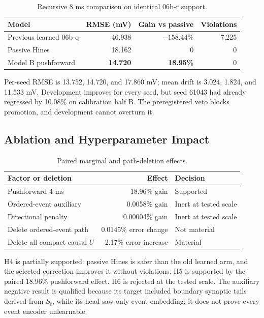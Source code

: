 \documentclass[11pt]{article}
\begin{document}
\begin{table}[t]
\centering
\caption{Recursive 8 ms comparison on identical 06b-r support.}
\label{tab:recursive}
\small
\begin{tabular}{lrrr}
\toprule
Model & RMSE (mV) & Gain vs passive & Violations \\
\midrule
Previous learned 06b-q & 46.938 & $-158.44\%$ & 7,225 \\
Passive Hines & 18.162 & 0 & 0 \\
Model B pushforward & \textbf{14.720} & \textbf{18.95\%} & 0 \\
\bottomrule
\end{tabular}
\end{table}

Per-seed RMSE is 13.752, 14.720, and 17.860 mV; mean drift is 3.024, 1.824,
and 11.533 mV. Development improves for every seed, but seed 61043 had already
regressed by 10.08\% on calibration half B. The preregistered veto blocks
promotion, and development cannot overturn it.

\subsection{Ablation and Hyperparameter Impact}

\begin{table}[t]
\centering
\caption{Paired marginal and path-deletion effects.}
\label{tab:factorial}
\small
\begin{tabular}{lrl}
\toprule
Factor or deletion & Effect & Decision \\
\midrule
Pushforward 4 ms & 18.96\% gain & Supported \\
Ordered-event auxiliary & 0.0058\% gain & Inert at tested scale \\
Directional penalty & 0.00004\% gain & Inert at tested scale \\
Delete ordered-event path & 0.0145\% error change & Not material \\
Delete all compact causal $U$ & 2.17\% error increase & Material \\
\bottomrule
\end{tabular}
\end{table}

H4 is partially supported: passive Hines is safer than the old learned arm,
and the selected correction improves it without violations. H5 is supported by
the paired 18.96\% pushforward effect. H6 is rejected at the tested scale. The
auxiliary negative result is qualified because its target included boundary
synaptic tails derived from $S_t$, while its head saw only event embedding; it
does not prove every event encoder unlearnable.
\end{document}
